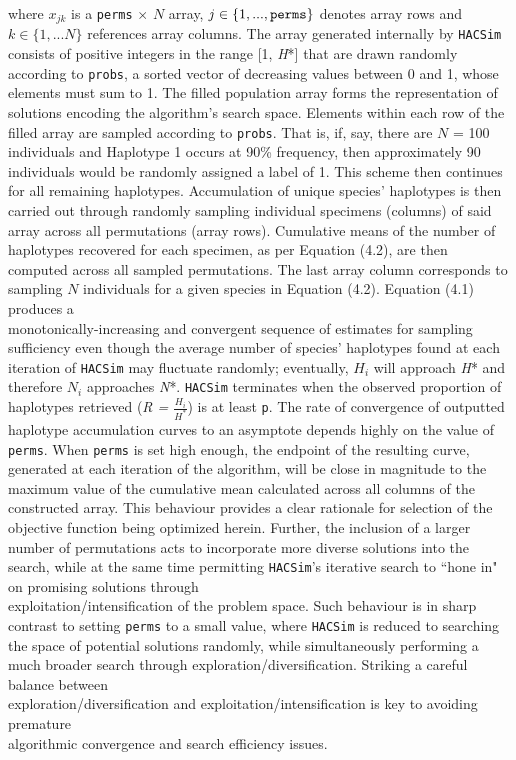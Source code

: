 \noindent where $x_{jk}$ is a {\tt perms} $\times$ $N$ array, $j \in \{1, ..., {\tt perms}\}$ denotes array rows and $k \in \{1,...N\}$ references array columns. The array generated internally by {\tt HACSim} consists of positive integers in the range [1, \textit{H}*] that are drawn randomly according to {\tt probs}, a sorted vector of decreasing values between 0 and 1, whose elements must sum to 1. The filled population array forms the representation of solutions encoding the algorithm's search space. Elements within each row of the filled array are sampled according to {\tt probs}. That is, if, say, there are $N$ = 100 individuals and Haplotype 1 occurs at 90\% frequency, then approximately 90 individuals would be randomly assigned a label of 1. This scheme then continues for all remaining haplotypes.  Accumulation of unique species' haplotypes is then carried out through randomly sampling individual specimens (columns) of said array across all permutations (array rows). Cumulative means of the number of haplotypes recovered for each specimen, as per Equation (4.2), are then computed across all sampled permutations. The last array column corresponds to sampling $N$ individuals for a given species in Equation (4.2). Equation (4.1) produces a \\ monotonically-increasing and convergent sequence of estimates for sampling sufficiency even though the average number of species' haplotypes found at each iteration of {\tt HACSim} may fluctuate randomly; eventually, $H_i$ will approach \textit{H}* and therefore $N_i$ approaches \textit{N}*. {\tt HACSim} terminates when the observed proportion of haplotypes retrieved (\textit{R = $\frac{H_i}{H^*}$}) is at least {\tt p}. The rate of convergence of outputted haplotype accumulation curves to an asymptote depends highly on the value of {\tt perms}. When {\tt perms} is set high enough, the endpoint of the resulting curve, generated at each iteration of the algorithm, will be close in magnitude to the maximum value of the cumulative mean calculated across all columns of the constructed array. This behaviour provides a clear rationale for selection of the objective function being optimized herein. Further, the inclusion of a larger number of permutations acts to incorporate more diverse solutions into the search, while at the same time permitting {\tt HACSim}'s iterative search to ``hone in" on promising solutions through \\ exploitation/intensification of the problem space. Such behaviour is in sharp contrast to setting {\tt perms} to a small value, where {\tt HACSim} is reduced to searching the space of potential solutions randomly, while simultaneously performing a much broader search through exploration/diversification. Striking a careful balance between \\ exploration/diversification and exploitation/intensification is key to avoiding premature \\ algorithmic convergence and search efficiency issues. 

